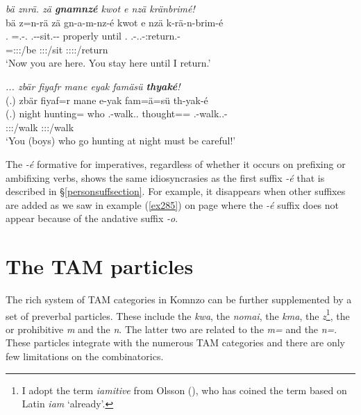 \begin{exe}
	\ex \emph{bä znrä. zä \textbf{gnamnzé} kwot e nzä kränbrimé!}\\
	\glll bä z=n-rä zä gn-a-m-nz-é kwot e nzä k-rä-n-brim-é\\
	\Second.\Abs{} \Prox=\Ssg.\Alph-\Cop.\Ndu{} \Prox{} \Ssg.\Bet-\Vc-sit.\Ext-\Ndu-\Imp{} properly until \Fsg.\Abs{} \M.\Bet-\Irr.\Vc.\Ndu-\Venit:return.\Rs-\Fsg{}\\
	{} \footnotesize{\Prox=\Ssg:\Sbj:\Nonpast:\Ipfv/be} {} \footnotesize{\Ssg:\Sbj:\Imp:\Ipfv/sit} {} {} {} \footnotesize{\Fsg:\Sbj:\Irr:\Pfv:\Venit/return}\\
	\trans `Now you are here. You stay here until I return.'
	\label{ex301}
\end{exe}
\begin{exe}
	\ex \emph{... zbär fiyafr mane eyak famäsü \textbf{thyaké}!}\\
	\glll (.) zbär fiyaf=r mane e-yak fam=ä=sü th-yak-é\\
	(.) night hunting=\Purp{} who \Stnsg.\Alph-walk.\Ext.\Ndu{} thought=\Assoc=\Etc{} \Stnsg.\Bet-walk.\Ext.\Ndu-\Imp\\
	{} {} {} {} \footnotesize{\Stpl:\Sbj:\Nonpast:\Ipfv/walk} {} \footnotesize{\Stpl:\Sbj:\Imp:\Ipfv/walk}\\
	\trans `You (boys) who go hunting at night must be careful!'
	\label{ex302}
\end{exe}

The \emph{-é} formative for imperatives, regardless of whether it occurs on prefixing or ambifixing verbs, shows the same idiosyncrasies as the first   suffix \emph{-é} that is described in \S{}\ref{personsuffsection}. For example, it disappears when other suffixes are added as we saw in example (\ref{ex285}) on page \pageref{ex285} where the \emph{-é} suffix does not appear because of the andative suffix \emph{-o}.

\section{The TAM particles}\label{TAMparticlessection}

The rich system of TAM categories in Komnzo can be further supplemented by a set of preverbal particles. These include the  \emph{kwa}, the  \emph{nomai}, the  \emph{kma}, the  \emph{z}\footnote{I adopt the term \emph{iamitive} from Olsson (\citeyear{Olsson:2013vn}), who has coined the term based on Latin \emph{iam} `already'.}, the  or prohibitive \emph{m} and the  \emph{n}. The latter two are related to the   \emph{m=} and the  \emph{n=}. These particles integrate with the numerous TAM categories and there are only few limitations on the combinatorics.

